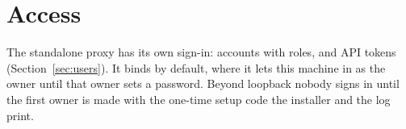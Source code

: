 \section{Access}

The standalone proxy has its own sign-in: accounts with roles, and API tokens (Section~\ref{sec:users}). It binds  by default, where it lets this machine in as the owner until that owner sets a password. Beyond loopback nobody signs in until the first owner is made with the one-time setup code the installer and the log print.

